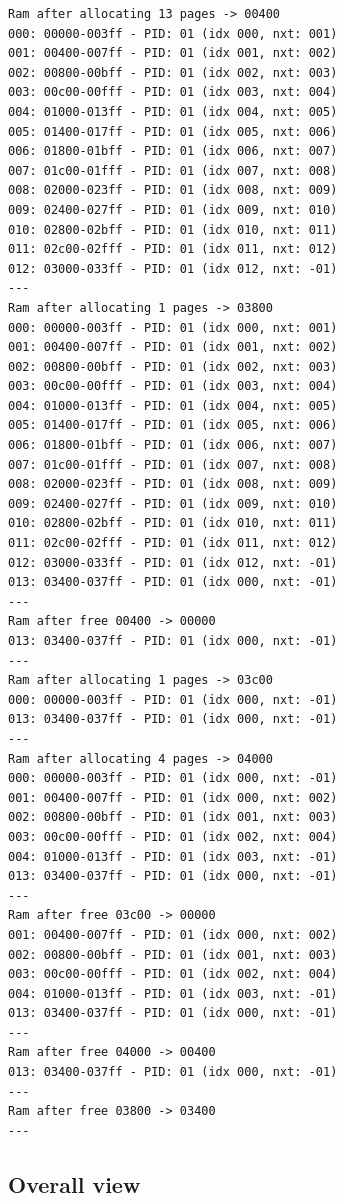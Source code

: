 \documentclass[]{article}
\begin{document}
\begin{verbatim}
Ram after allocating 13 pages -> 00400
000: 00000-003ff - PID: 01 (idx 000, nxt: 001)
001: 00400-007ff - PID: 01 (idx 001, nxt: 002)
002: 00800-00bff - PID: 01 (idx 002, nxt: 003)
003: 00c00-00fff - PID: 01 (idx 003, nxt: 004)
004: 01000-013ff - PID: 01 (idx 004, nxt: 005)
005: 01400-017ff - PID: 01 (idx 005, nxt: 006)
006: 01800-01bff - PID: 01 (idx 006, nxt: 007)
007: 01c00-01fff - PID: 01 (idx 007, nxt: 008)
008: 02000-023ff - PID: 01 (idx 008, nxt: 009)
009: 02400-027ff - PID: 01 (idx 009, nxt: 010)
010: 02800-02bff - PID: 01 (idx 010, nxt: 011)
011: 02c00-02fff - PID: 01 (idx 011, nxt: 012)
012: 03000-033ff - PID: 01 (idx 012, nxt: -01)
---
Ram after allocating 1 pages -> 03800
000: 00000-003ff - PID: 01 (idx 000, nxt: 001)
001: 00400-007ff - PID: 01 (idx 001, nxt: 002)
002: 00800-00bff - PID: 01 (idx 002, nxt: 003)
003: 00c00-00fff - PID: 01 (idx 003, nxt: 004)
004: 01000-013ff - PID: 01 (idx 004, nxt: 005)
005: 01400-017ff - PID: 01 (idx 005, nxt: 006)
006: 01800-01bff - PID: 01 (idx 006, nxt: 007)
007: 01c00-01fff - PID: 01 (idx 007, nxt: 008)
008: 02000-023ff - PID: 01 (idx 008, nxt: 009)
009: 02400-027ff - PID: 01 (idx 009, nxt: 010)
010: 02800-02bff - PID: 01 (idx 010, nxt: 011)
011: 02c00-02fff - PID: 01 (idx 011, nxt: 012)
012: 03000-033ff - PID: 01 (idx 012, nxt: -01)
013: 03400-037ff - PID: 01 (idx 000, nxt: -01)
---
Ram after free 00400 -> 00000
013: 03400-037ff - PID: 01 (idx 000, nxt: -01)
---
Ram after allocating 1 pages -> 03c00
000: 00000-003ff - PID: 01 (idx 000, nxt: -01)
013: 03400-037ff - PID: 01 (idx 000, nxt: -01)
---
Ram after allocating 4 pages -> 04000
000: 00000-003ff - PID: 01 (idx 000, nxt: -01)
001: 00400-007ff - PID: 01 (idx 000, nxt: 002)
002: 00800-00bff - PID: 01 (idx 001, nxt: 003)
003: 00c00-00fff - PID: 01 (idx 002, nxt: 004)
004: 01000-013ff - PID: 01 (idx 003, nxt: -01)
013: 03400-037ff - PID: 01 (idx 000, nxt: -01)
---
Ram after free 03c00 -> 00000
001: 00400-007ff - PID: 01 (idx 000, nxt: 002)
002: 00800-00bff - PID: 01 (idx 001, nxt: 003)
003: 00c00-00fff - PID: 01 (idx 002, nxt: 004)
004: 01000-013ff - PID: 01 (idx 003, nxt: -01)
013: 03400-037ff - PID: 01 (idx 000, nxt: -01)
---
Ram after free 04000 -> 00400
013: 03400-037ff - PID: 01 (idx 000, nxt: -01)
---
Ram after free 03800 -> 03400
---
\end{verbatim}

\subsection{Overall view}\label{overall-view}
\end{document}
